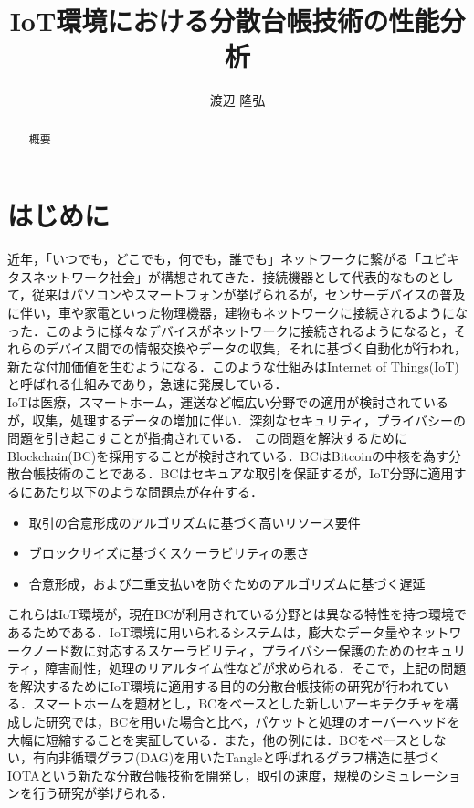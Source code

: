 \documentclass[japanese, macos]{KU2}
\begin{document}
\fontsize{12}{20} \selectfont

\title{IoT環境における分散台帳技術の性能分析}
\author{渡辺 隆弘}
\maketitle %

\begin{abstract}
概要
\end{abstract}


\tableofcontents

\chapter{はじめに}
近年，「いつでも，どこでも，何でも，誰でも」ネットワークに繋がる「ユビキタスネットワーク社会」が構想されてきた．接続機器として代表的なものとして，従来はパソコンやスマートフォンが挙げられるが，センサーデバイスの普及に伴い，車や家電といった物理機器，建物もネットワークに接続されるようになった．このように様々なデバイスがネットワークに接続されるようになると，それらのデバイス間での情報交換やデータの収集，それに基づく自動化が行われ，新たな付加価値を生むようになる．このような仕組みはInternet of Things(IoT)と呼ばれる仕組みであり，急速に発展している\cite{Atzori2010}\cite{Gubbi2013}．\\
IoTは医療，スマートホーム，運送など幅広い分野での適用が検討されているが，収集，処理するデータの増加に伴い．深刻なセキュリティ，プライバシーの問題を引き起こすことが指摘されている\cite{dorri2017towards}．
この問題を解決するためにBlockchain(BC)を採用することが検討されている．BCはBitcoin\cite{nakamoto2008bitcoin}の中核を為す分散台帳技術のことである．BCはセキュアな取引を保証するが，IoT分野に適用するにあたり以下のような問題点が存在する．

\begin{itemize}
\item 取引の合意形成のアルゴリズムに基づく高いリソース要件
\item ブロックサイズに基づくスケーラビリティの悪さ
\item 合意形成，および二重支払いを防ぐためのアルゴリズムに基づく遅延
\end{itemize}

これらはIoT環境が，現在BCが利用されている分野とは異なる特性を持つ環境であるためである．IoT環境に用いられるシステムは，膨大なデータ量やネットワークノード数に対応するスケーラビリティ，プライバシー保護のためのセキュリティ，障害耐性，処理のリアルタイム性などが求められる．そこで，上記の問題を解決するためにIoT環境に適用する目的の分散台帳技術の研究が行われている．スマートホームを題材とし，BCをベースとした新しいアーキテクチャを構成した研究\cite{dorri2017towards}では，BCを用いた場合と比べ，パケットと処理のオーバーヘッドを大幅に短縮することを実証している．また，他の例には．BCをベースとしない，有向非循環グラフ(DAG)を用いたTangleと呼ばれるグラフ構造に基づくIOTAという新たな分散台帳技術を開発し，取引の速度，規模のシミュレーションを行う研究\cite{popov2016tangle}\cite{kusmierz2017first}が挙げられる．
\end{document}
